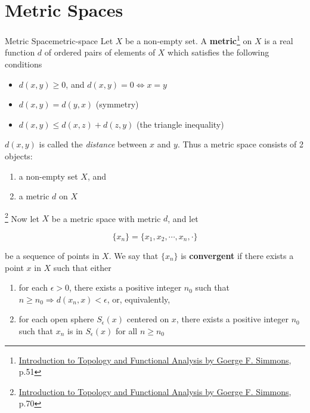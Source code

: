\section{Metric Spaces}

\begin{Definition}{Metric Space}{metric-space}
    Let $X$ be a non-empty set. A \textbf{metric}\footnote{\href{https://trello.com/c/3EPccNTa}{Introduction to Topology and Functional Analysis by Goerge F. Simmons}, p.51}
    on $X$ is a real function $d$ of ordered pairs of elements of $X$ which satisfies the following conditions

    \begin{itemize}
        \item $d(x, y) \ge 0$, and $d(x, y) = 0 \iff x = y$
        \item $d(x, y) = d(y, x)$ (symmetry)
        \item $d(x, y) \le d(x, z) + d(z, y)$ (the triangle inequality)
    \end{itemize}
\end{Definition}

$d(x, y)$ is called the \textit{distance} between $x$ and $y$. Thus a metric space consists of 2 objects:

\begin{enumerate}
    \item a non-empty set $X$, and
    \item a metric $d$ on $X$
\end{enumerate}

\footnote{\href{https://trello.com/c/3EPccNTa}{Introduction to Topology and Functional Analysis by Goerge F. Simmons}, p.70}
Now let $X$ be a metric space with metric $d$, and let

\begin{equation}
    \{ x_n \} = \{ x_1, x_2, \cdots, x_n, \cdot \}
\end{equation}

be a sequence of points in $X$. We say that $\{ x_n \}$ is \textbf{convergent} if there exists a point $x$ in $X$ such
that either

\begin{enumerate}
    \item for each $\epsilon > 0$, there exists a positive integer $n_0$ such that $n \ge n_0 \Rightarrow d(x_n, x) < \epsilon$,
          or, equivalently,
    \item for each open sphere $S_{\epsilon}(x)$ centered on $x$, there exists a positive integer $n_0$ such that $x_n$
          is in $S_{\epsilon}(x)$ for all $n \ge n_0$
\end{enumerate}

